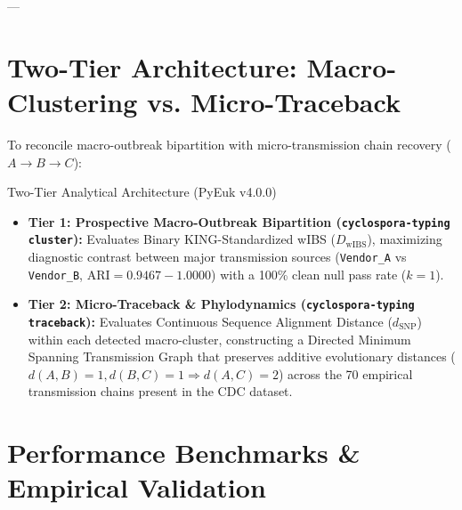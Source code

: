 \documentclass[11pt,a4paper]{article}
\begin{document}
---

\section{Two-Tier Architecture: Macro-Clustering vs. Micro-Traceback}

To reconcile macro-outbreak bipartition with micro-transmission chain recovery ($A \to B \to C$):

\begin{conceptbox}{Two-Tier Analytical Architecture (PyEuk v4.0.0)}
\begin{itemize}[leftmargin=*]
    \item \textbf{Tier 1: Prospective Macro-Outbreak Bipartition (\texttt{cyclospora-typing cluster}):} Evaluates Binary KING-Standardized wIBS ($D_{\text{wIBS}}$), maximizing diagnostic contrast between major transmission sources (\texttt{Vendor\_A} vs \texttt{Vendor\_B}, $\text{ARI} = 0.9467 - 1.0000$) with a 100\% clean null pass rate ($k=1$).
    \item \textbf{Tier 2: Micro-Traceback \& Phylodynamics (\texttt{cyclospora-typing traceback}):} Evaluates Continuous Sequence Alignment Distance ($d_{\text{SNP}}$) within each detected macro-cluster, constructing a Directed Minimum Spanning Transmission Graph that preserves additive evolutionary distances ($d(A,B)=1, d(B,C)=1 \Rightarrow d(A,C)=2$) across the 70 empirical transmission chains present in the CDC dataset.
\end{itemize}
\end{conceptbox}

\section{Performance Benchmarks \& Empirical Validation}
\end{document}
